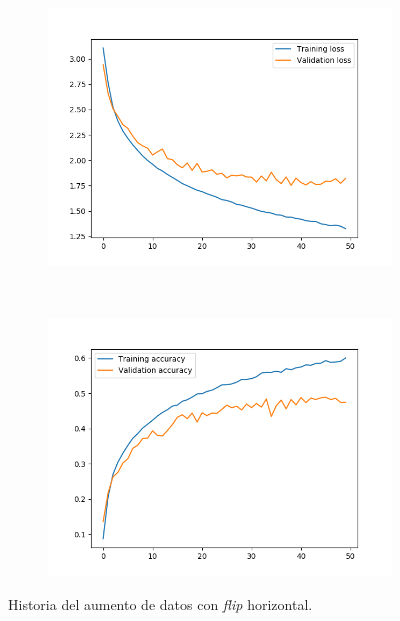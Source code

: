 \documentclass[11pt,a4paper]{article}
\begin{document}
\begin{figure}[H]
  \centering
  \begin{subfigure}{.5\textwidth}
    \centering
    \includegraphics[scale=0.4]{img/aug-flip-loss.png}
    \label{fig:aug-flip-loss}
  \end{subfigure}%
  ~ \quad
  \begin{subfigure}{.5\textwidth}
    \centering
    \includegraphics[scale=0.4]{img/aug-flip-acc.png}
    \label{fig:aug-flip-acc}
  \end{subfigure}
  \caption{Historia del aumento de datos con \textit{flip} horizontal.}
  \label{fig:history-aug-flip}
\end{figure}
\end{document}

